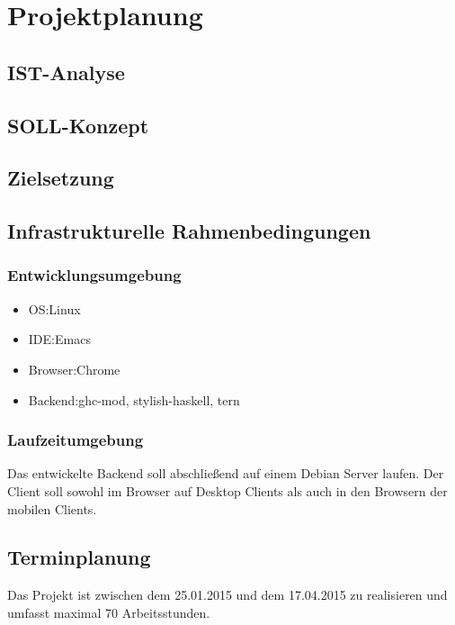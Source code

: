 \section{Projektplanung}
\subsection{IST-Analyse}
\subsection{SOLL-Konzept}
\subsection{Zielsetzung}
\subsection{Infrastrukturelle Rahmenbedingungen}
\subsubsection{Entwicklungsumgebung}
\begin{itemize}
\item OS:Linux
\item IDE:Emacs
\item Browser:Chrome
\item Backend:ghc-mod, stylish-haskell, tern
\end{itemize}
\subsubsection{Laufzeitumgebung}
Das entwickelte Backend soll abschließend auf einem Debian Server laufen. Der Client soll sowohl im Browser auf Desktop Clients als auch in den Browsern der mobilen Clients.
\subsection{Terminplanung}
Das Projekt ist zwischen dem 25.01.2015 und dem 17.04.2015 zu realisieren und umfasst maximal 70 Arbeitsstunden.
